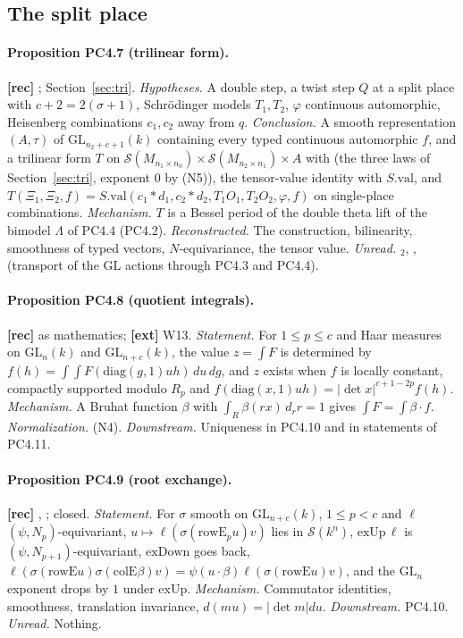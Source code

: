 \documentclass[11pt]{article}
\newcommand{\GL}{\mathrm{GL}}
\newcommand{\Sch}{\mathcal S}
\begin{document}
\subsection{The split place}

\paragraph{Proposition PC4.7 (trilinear form).} \textbf{[rec]} ; Section~\ref{sec:tri}.
\emph{Hypotheses.} A double step, a twist step $Q$ at a split place with $c+2=2(\sigma+1)$, Schr\"odinger models $T_1,T_2$, $\varphi$ continuous automorphic, Heisenberg combinations $c_1,c_2$ away from $q$. \emph{Conclusion.} A smooth representation $(A,\tau)$ of $\GL_{n_2+c+1}(k)$ containing every typed continuous automorphic $f$, and a trilinear form $T$ on $\Sch(M_{n_1\times n_0})\times\Sch(M_{n_2\times n_1})\times A$ with  (the three laws of Section~\ref{sec:tri}, exponent $0$ by (N5)), the tensor-value identity with $S.\mathrm{val}$, and $T(\Xi_1,\Xi_2,f)=S.\mathrm{val}(c_1*d_1,c_2*d_2,T_1O_1,T_2O_2,\varphi,f)$ on single-place combinations. \emph{Mechanism.} $T$ is a Bessel period of the double theta lift of the bimodel $\Lambda$ of PC4.4 (PC4.2). \emph{Reconstructed.} The construction, bilinearity, smoothness of typed vectors, $N$-equivariance, the tensor value. \emph{Unread.} $_2$, ,  (transport of the $\GL$ actions through PC4.3 and PC4.4).

\paragraph{Proposition PC4.8 (quotient integrals).} \textbf{[rec]} as mathematics; \textbf{[ext]} W13.
\emph{Statement.} For $1\le p\le c$ and Haar measures on $\GL_n(k)$ and $\GL_{n+c}(k)$, the value $z=\int F$ is determined by $f(h)=\int\!\int F(\mathrm{diag}(g,1)uh)\,du\,dg$, and $z$ exists when $f$ is locally constant, compactly supported modulo $R_p$ and $f(\mathrm{diag}(x,1)uh)=\lvert\det x\rvert^{c+1-2p}f(h)$. \emph{Mechanism.} A Bruhat function $\beta$ with $\int_R\beta(rx)\,d_rr=1$ gives $\int F=\int\beta\cdot f$. \emph{Normalization.} (N4). \emph{Downstream.} Uniqueness in PC4.10 and in  statements of PC4.11.

\paragraph{Proposition PC4.9 (root exchange).} \textbf{[rec]} , ; closed.
\emph{Statement.} For $\sigma$ smooth on $\GL_{n+c}(k)$, $1\le p<c$ and $\ell$ $(\psi,N_p)$-equivariant, $u\mapsto\ell(\sigma(\mathrm{rowE}_pu)v)$ lies in $\Sch(k^n)$, $\mathrm{exUp}\,\ell$ is $(\psi,N_{p+1})$-equivariant, $\mathrm{exDown}$ goes back, $\ell(\sigma(\mathrm{rowE}u)\sigma(\mathrm{colE}\beta)v)=\psi(u\cdot\beta)\ell(\sigma(\mathrm{rowE}u)v)$, and the $\GL_n$ exponent drops by $1$ under $\mathrm{exUp}$. \emph{Mechanism.} Commutator identities, smoothness, translation invariance, $d(mu)=\lvert\det m\rvert du$. \emph{Downstream.} PC4.10. \emph{Unread.} Nothing.
\end{document}
